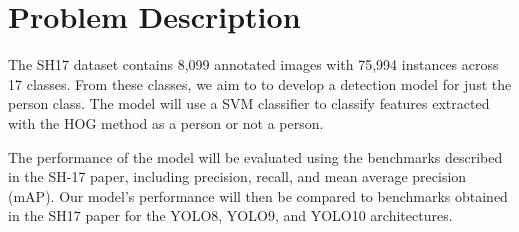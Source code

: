 \section{Problem Description}

The SH17 dataset contains 8,099 annotated images with 75,994 instances across 17 classes. 
From these classes, we aim to to develop a detection model for just the person class.
The model will use a SVM classifier to classify features extracted with the HOG method as a person or not a person.

The performance of the model will be evaluated using the benchmarks described in the SH-17 paper, including precision, recall, and mean average precision (mAP).
Our model's performance will then be compared to benchmarks obtained in the SH17 paper for the YOLO8, YOLO9, and YOLO10 architectures. 
